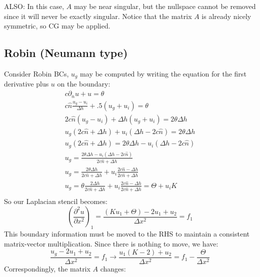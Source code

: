 \documentclass[landscape]{article}
\newcommand{\PD}{\partial}
\begin{document}
ALSO: In this case, $A$ may be near singular, but the nullspace cannot be removed since it will never be exactly singular. Notice that the matrix $A$ is already nicely symmetric, so CG may be applied.

\subsection{Robin (Neumann type)}
Consider Robin BCs, $u_g$ may be computed by writing the equation for the first derivative plus $u$ on the boundary:
\begin{equation}\begin{aligned}
  c \PD_n u + u = \theta \\
  c \hat{n} \frac{u_g - u_i}{\Delta h} + .5 (u_g+u_i) = \theta \\
  2 c \hat{n} (u_g - u_i) + \Delta h (u_g+u_i) = 2 \theta \Delta h \\
  u_g (2 c \hat{n} + \Delta h) + u_i (\Delta h - 2c \hat{n}) = 2 \theta \Delta h \\
  u_g (2 c \hat{n} + \Delta h) = 2 \theta \Delta h - u_i (\Delta h - 2c \hat{n}) \\
  u_g = \frac{2 \theta \Delta h - u_i (\Delta h - 2c \hat{n})}{2 c \hat{n} + \Delta h} \\
  u_g = \frac{2 \theta \Delta h}{2 c \hat{n} + \Delta h} + u_i \frac{2c \hat{n} - \Delta h}{2 c \hat{n} + \Delta h} \\
  u_g = \theta \frac{2 \Delta h}{2 c \hat{n} + \Delta h} + u_i \frac{2c \hat{n} - \Delta h}{2 c \hat{n} + \Delta h} = \Theta + u_i K \\
\end{aligned}\end{equation}
So our Laplacian stencil becomes:
\begin{equation}
   \left(\frac{\partial^2 u}{\partial x^2}\right)_{1} =
   \frac{(K u_1 + \Theta) - 2 u_1 + u_{2}}{\Delta x^2} = f_1
\end{equation}
This boundary information must be moved to the RHS to maintain a consistent matrix-vector multiplication. Since there is nothing to move, we have:
\begin{equation}
   \frac{u_g - 2 u_1 + u_{2}}{\Delta x^2} = f_1
   \rightarrow
   \frac{u_1(K-2) + u_{2}}{\Delta x^2} = f_1 - \frac{\Theta}{\Delta x^2}
\end{equation}
Correspondingly, the matrix $A$ changes:
\end{document}
